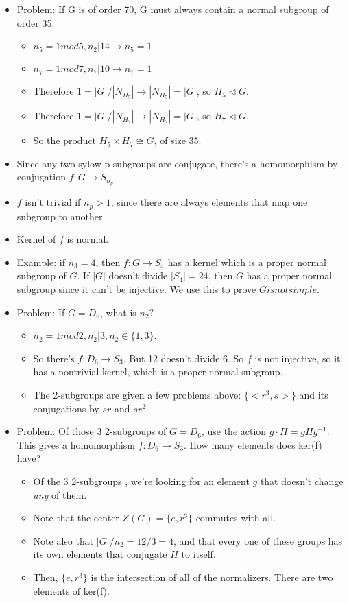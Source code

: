 \documentclass[11pt, oneside]{article}   	%
\begin{document}
\begin{itemize}
\item Problem: If G is of order 70, G must always contain a normal subgroup of order 35.
\begin{itemize}
\item $n_ 5= 1 mod 5, n_2 | 14 \rightarrow n_5 = 1$
\item $n_ 7= 1 mod 7, n_7 | 10 \rightarrow n_7 = 1$
\item Therefore $1 = |G| / |N_{H_5}| \rightarrow |N_{H_5}|  = |G|$, so $ H_5 \triangleleft G$.
\item Therefore $1 = |G| / |N_{H_7}| \rightarrow |N_{H_7}|  = |G|$, so $ H_7 \triangleleft G$.
\item So the product $H_5 \times H_7 \cong G$, of size 35.
\end{itemize}

\item Since any two sylow p-subgroups are conjugate, there's a homomorphism by conjugation $f: G \rightarrow S_{n_p}$.
\item $f$ isn't trivial if $n_p > 1$, since there are always elements that map one subgroup to another.
\item Kernel of $f$ is normal.
\item Example: if $n_3 = 4$, then $f: G \rightarrow S_4$ has a kernel which is a proper normal subgroup of $G$.  If $|G|$ doesn't divide $|S_4| = 24$, then $G$ has a proper normal subgroup since it can't be injective.  We use this to prove $G is not simple$.

\item Problem: If $G = D_6$, what is $n_2$?
\begin{itemize}
\item $n_2 = 1 mod 2, n_2 | 3, n_2 \in \{1, 3\}$.
\item So there's $f: D_6 \rightarrow S_3$.  But 12 doesn't divide 6.  So $f$ is not injective, so it has a nontrivial kernel, which is a proper normal subgroup.
\item The 2-subgroups are given a few problems above: $\{<r^3, s>\}$ and its conjugations by $sr$ and $sr^2$.
\end{itemize}

\item Problem: Of those 3 2-subgroups of $G = D_6$, use the action $g \cdot H = gHg^{-1}$.  This gives a homomorphism $f: D_6 \rightarrow S_3$.  How many elements does ker(f) have?
\begin{itemize}
\item Of the 3 2-subgroups , we're looking for an element $g$ that doesn't change \emph{any} of them.
\item Note that the center $Z(G) = \{e, r^3\}$ commutes with all.
\item Note also that $|G| / n_2 = 12 / 3 = 4$, and that every one of these groups has its own elements that conjugate $H$ to itself.
\item Then, $\{e, r^3\}$ is the intersection of all of the normalizers.  There are two elements of ker(f).
\end{itemize}


\end{itemize}
\end{document}
